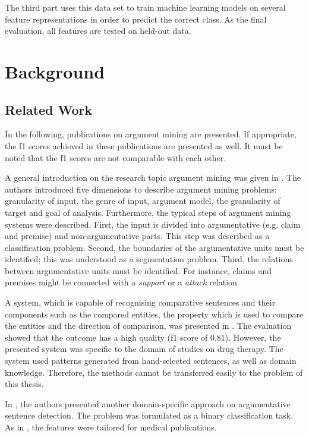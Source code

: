 The third part uses this data set to train machine learning models on several feature representations in order to predict the correct class. As the final evaluation, all features are tested on held-out data.

\chapter{Background}
\section{Related Work}
\label{sec:argth}
\label{sec:argmine}
In the following, publications on argument mining are presented. If appropriate, the f1 scores achieved in these publications are presented as well. It must be noted that the f1 scores are not comparable with each other.

A general introduction on the research topic argument mining was given in \cite{Lippi2016Argumentation-M}.
The authors introduced five dimensions to describe argument mining problems: granularity of input, the genre of input, argument model, the granularity of target and goal of analysis.  Furthermore, the typical steps of argument mining systems were described. First, the input is divided into argumentative (e.g. claim and premise) and non-argumentative parts. This step was described as a classification problem. Second, the boundaries of the argumentative units must be identified; this was understood as a segmentation problem. Third, the relations between argumentative units must be identified. For instance, claims and premises might be connected with a \emph{support} or a \emph{attack} relation.



A system, which is capable of recognising comparative sentences and their components such as the compared entities, the property which is used to compare the entities and the direction of comparison, was presented in \cite{fiszman2007interpreting}. The evaluation showed that the outcome has a high quality (f1 score of 0.81). However, the presented system was specific to the domain of studies on drug therapy. The system used patterns generated from hand-selected sentences, as well as domain knowledge. Therefore, the methods cannot be transferred easily to the problem of this thesis.

In \cite{park2012identifying}, the authors presented another domain-specific approach on argumentative sentence detection. The problem was formulated as a binary classification task. As in \cite{fiszman2007interpreting}, the features were tailored for medical publications.

